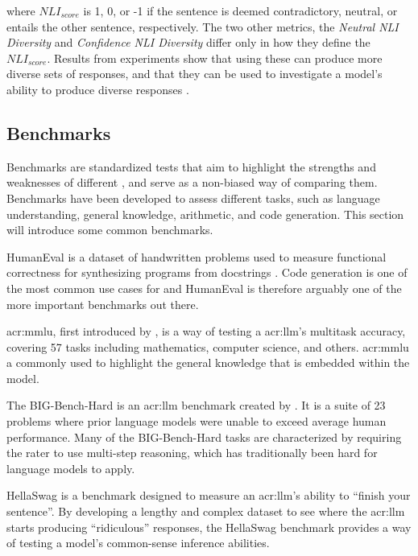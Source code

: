 where $NLI_{score}$ is 1, 0, or -1 if the sentence is deemed contradictory, neutral, or entails the other sentence, respectively. The two other metrics, the \textit{Neutral NLI Diversity} and \textit{Confidence NLI Diversity} differ only in how they define the $NLI_{score}$. Results from experiments show that using these can produce more diverse sets of responses, and that they can be used to investigate a model's ability to produce diverse responses \citep[9]{stasaskiSemanticDiversityDialogue2022}.

\subsection{Benchmarks}\label{subsec:benchmarks}

Benchmarks are standardized tests that aim to highlight the strengths and weaknesses of different , and serve as a non-biased way of comparing them. Benchmarks have been developed to assess different tasks, such as language understanding, general knowledge, arithmetic, and code generation. This section will introduce some common benchmarks.

HumanEval is a dataset of handwritten problems used to measure functional correctness for synthesizing programs from docstrings \citep[2-4]{chenEvaluatingLargeLanguage2021}. Code generation is one of the most common use cases for  and HumanEval is therefore arguably one of the more important benchmarks out there.

\gls{acr:mmlu}, first introduced by \cite{hendrycksMeasuringMassiveMultitask2021}, is a way of testing a \acrlong{acr:llm}'s multitask accuracy, covering 57 tasks including mathematics, computer science, and others. \gls{acr:mmlu} a commonly used to highlight the general knowledge that is embedded within the model.

The BIG-Bench-Hard is an \acrshort{acr:llm} benchmark created by \cite{suzgunChallengingBIGBenchTasks2022}. It is a suite of 23 problems where prior language models were unable to exceed average human performance. Many of the BIG-Bench-Hard tasks are characterized by requiring the rater to use multi-step reasoning, which has traditionally been hard for language models to apply.

HellaSwag \citep{zellersHellaSwagCanMachine2019} is a benchmark designed to measure an \acrshort{acr:llm}'s ability to \enquote{finish your sentence}. By developing a lengthy and complex dataset to see where the \acrshort{acr:llm} starts producing \enquote{ridiculous} responses, the HellaSwag benchmark provides a way of testing a model's common-sense inference abilities.

